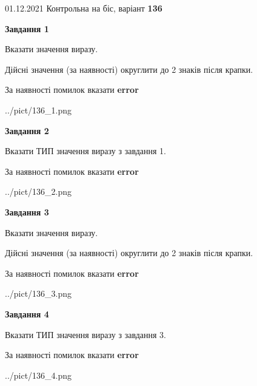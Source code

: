 \documentclass[11pt, ukrainian]{article}
\begin{document}
{01.12.2021 Контрольна на біс, варіант  \No \textbf { 136 }\par}
{
\begin {large}
{\begin {center}\textbf{Завдання 1}\end {center}}\par
Вказати значення виразу. \par
Дійсні значення (за наявності) округлити до 2 знаків після крапки. \par
За наявності помилок вказати \textbf{error}

\begin{center}
	{../pict/136_1.png}
\end{center}
\newpage

{\begin {center}\textbf{Завдання 2}\end {center}}\par
Вказати ТИП значення виразу з завдання 1. \par
За наявності помилок вказати \textbf{error}

\begin{center}
	{../pict/136_2.png}
\end{center}
\newpage

{\begin {center}\textbf{Завдання 3}\end {center}}\par
Вказати значення виразу. \par
Дійсні значення (за наявності) округлити до 2 знаків після крапки. \par
За наявності помилок вказати \textbf{error}

\begin{center}
	{../pict/136_3.png}
\end{center}
\newpage

{\begin {center}\textbf{Завдання 4}\end {center}}\par
Вказати ТИП значення виразу з завдання 3. \par
За наявності помилок вказати \textbf{error}

\begin{center}
	{../pict/136_4.png}
\end{center}
\newpage


\end{large}}
\end{document}
